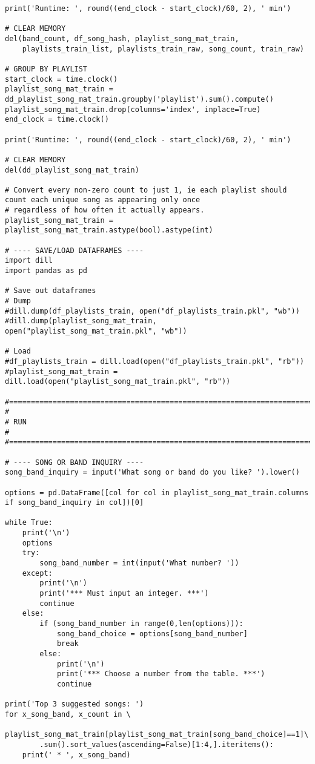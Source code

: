 \documentclass[11pt]{article}
\begin{document}
\begin{verbatim}
print('Runtime: ', round((end_clock - start_clock)/60, 2), ' min')

# CLEAR MEMORY 
del(band_count, df_song_hash, playlist_song_mat_train, 
    playlists_train_list, playlists_train_raw, song_count, train_raw)
    
# GROUP BY PLAYLIST 
start_clock = time.clock()
playlist_song_mat_train = dd_playlist_song_mat_train.groupby('playlist').sum().compute()
playlist_song_mat_train.drop(columns='index', inplace=True)
end_clock = time.clock()

print('Runtime: ', round((end_clock - start_clock)/60, 2), ' min')

# CLEAR MEMORY 
del(dd_playlist_song_mat_train)

# Convert every non-zero count to just 1, ie each playlist should count each unique song as appearing only once
# regardless of how often it actually appears.
playlist_song_mat_train = playlist_song_mat_train.astype(bool).astype(int)

# ---- SAVE/LOAD DATAFRAMES ----
import dill
import pandas as pd

# Save out dataframes
# Dump
#dill.dump(df_playlists_train, open("df_playlists_train.pkl", "wb"))
#dill.dump(playlist_song_mat_train, open("playlist_song_mat_train.pkl", "wb"))

# Load
#df_playlists_train = dill.load(open("df_playlists_train.pkl", "rb"))
#playlist_song_mat_train = dill.load(open("playlist_song_mat_train.pkl", "rb"))

#==============================================================================
#
# RUN
#
#==============================================================================

# ---- SONG OR BAND INQUIRY ----
song_band_inquiry = input('What song or band do you like? ').lower()

options = pd.DataFrame([col for col in playlist_song_mat_train.columns if song_band_inquiry in col])[0]

while True:
    print('\n')
    options
    try:
        song_band_number = int(input('What number? '))
    except:
        print('\n')
        print('*** Must input an integer. ***')
        continue
    else: 
        if (song_band_number in range(0,len(options))):
            song_band_choice = options[song_band_number]
            break
        else:
            print('\n')
            print('*** Choose a number from the table. ***')
            continue
            
print('Top 3 suggested songs: ')
for x_song_band, x_count in \
    playlist_song_mat_train[playlist_song_mat_train[song_band_choice]==1]\
        .sum().sort_values(ascending=False)[1:4,].iteritems():
    print(' * ', x_song_band)
\end{verbatim}


    
    
    
    
\end{document}
